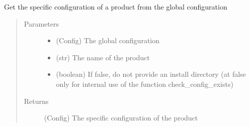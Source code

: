 \documentclass[a4paper,10pt,english]{sphinxmanual}
\begin{document}

\begin{fulllineitems}
\label{\detokenize{apidoc_src/src:src.product.get_product_config}}
Get the specific configuration of a product 
from the global configuration
\begin{quote}\begin{description}
\item[{Parameters}] \leavevmode\begin{itemize}
\item {} 
 \textendash{} (Config) The global configuration

\item {} 
 \textendash{} (str) The name of the product

\item {} 
 \textendash{} (boolean)
If false, do not provide an install directory 
(at false only for internal use of the function check\_config\_exists)

\end{itemize}

\item[{Returns}] \leavevmode
(Config) The specific configuration of the product

\end{description}\end{quote}

\end{fulllineitems}

\end{document}
